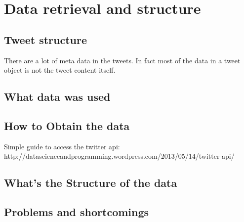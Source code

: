 \chapter{Data retrieval and structure}

\section{Tweet structure}
There are a lot of meta data in the tweets. In fact most of the data in a tweet
object is not the tweet content itself. 

\section{What data was used}
\section{How to Obtain the data}
Simple guide to access the twitter api:  http://datascienceandprogramming.wordpress.com/2013/05/14/twitter-api/

\section{What's the Structure of the data}
\section{Problems and shortcomings}
